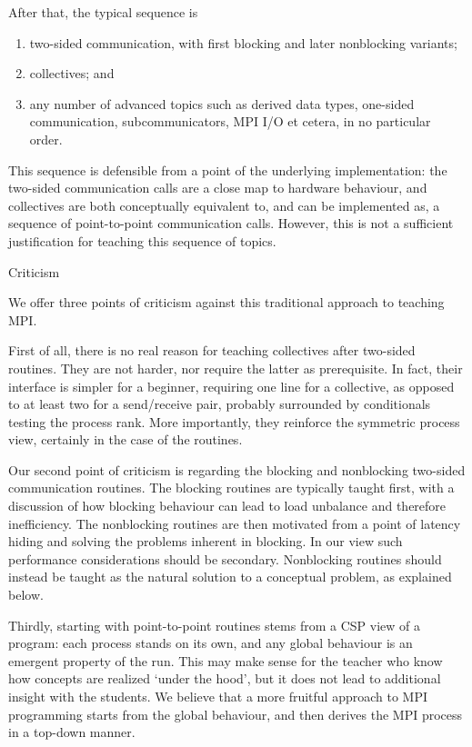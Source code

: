 After that, the typical sequence is
\begin{enumerate}
\item two-sided communication, with first blocking and later nonblocking variants;
\item collectives; and 
\item any number of advanced topics such as derived data types,
  one-sided communication, subcommunicators,
  MPI I/O et cetera, in no particular order.
\end{enumerate}
This sequence is defensible from a point of the underlying implementation:
the two-sided communication calls are a close map to hardware behaviour,
and collectives are both conceptually equivalent to, and
can be implemented as, a sequence of point-to-point communication calls.
However, this is not a sufficient justification for
teaching this sequence of topics.

 {Criticism}

We offer three points of criticism against this traditional approach to teaching MPI.

First of all, there is
no real reason for teaching collectives after two-sided routines. They
are not harder, nor require the latter as prerequisite. In fact, their
interface is simpler for a beginner, requiring one line for a collective, as
opposed to at least two for a send/receive pair, probably surrounded
by conditionals testing the process rank. More importantly, they
reinforce the symmetric process view, certainly in the case of the
 routines.

Our second point of criticism is regarding the blocking and
nonblocking two-sided communication routines.
%
The blocking routines are typically taught
first, with a discussion of how blocking behaviour can lead to load
unbalance and therefore inefficiency. The nonblocking routines are
then motivated from a point of latency hiding and solving the problems
inherent in blocking. In our view such performance considerations
should be secondary.
Nonblocking routines should instead be taught as the natural solution to a
conceptual problem, as explained below.

Thirdly, starting with point-to-point routines stems from a
\ac{CSP}\cite{Hoare:CSP} view of a program:
each process stands on its own, and any global behaviour is an emergent
property of the run. This may make sense for the teacher who know
how concepts are realized `under the hood', but it does not lead
to additional insight with the students.
We believe that a more fruitful approach to MPI
programming starts from the global behaviour, and then derives the MPI
process in a top-down manner.

